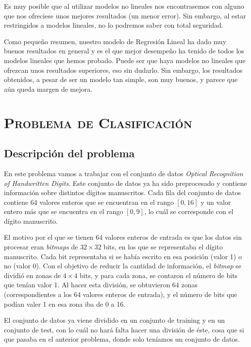 \documentclass[11pt,a4paper]{article}
\begin{document}
Es muy posible que al utilizar modelos no lineales nos encontrasemos con
alguno que nos ofreciese unos mejores resultados (un menor error). Sin
embargo, al estar restringidos a modelos lineales, no lo podremos saber
con total seguridad.

Como pequeño resumen, nuestro modelo de Regresión Lineal ha dado muy
buenos resultados en general y es el que mejor desempeño ha tenido de
todos los modelos lineales que hemos probado. Puede ser que haya modelos
no lineales que ofrezcan unos resultados superiores, eso sin dudarlo.
Sin embargo, los resultados obtenidos, a pesar de ser un modelo tan
simple, son muy buenos, y parece que aún queda margen de mejora.

\newpage

\section{\textsc{Problema de Clasificación}}

\subsection{Descripción del problema}\label{descripciuxf3n-del-problema}

    En este problema vamos a trabajar con el conjunto de datos \emph{Optical
Recognition of Handwritten Digits}. Este conjunto de datos ya ha sido
preprocesado y contiene información sobre distintos dígitos manuscritos.
Cada fila del conjunto de datos contiene 64 valores enteros que se
encuentran en el rango \([0, 16]\) y un valor entero más que se
encuentra en el rango \([0, 9]\), lo cuál se corresponde con el dígito
manuscrito.

El motivo por el que se tienen 64 valores enteros de entrada es que los
datos sin procesar eran \emph{bitmaps} de \(32 \times 32\) bits, en los
que se representaba el dígito manuscrito. Cada bit representaba si se
había escrito en esa posición (valor 1) o no (valor 0). Con el objetivo
de reducir la cantidad de información, el \emph{bitmap} se dividió en
zonas de \(4 \times 4\) bits, y para cada zona, se contaron el número de
bits que tenían valor 1. Al hacer esta división, se obtuvieron 64 zonas
(correspondientes a los 64 valores enteros de entrada), y el número de
bits que podían valer 1 en esa zona iba de 0 a 16.

El conjunto de datos ya viene dividido en un conjunto de training y en
un conjunto de test, con lo cuál no hará falta hacer una división de
éste, cosa que si que pasaba en el anterior problema, donde solo
teníamos un conjunto de datos.
\end{document}
